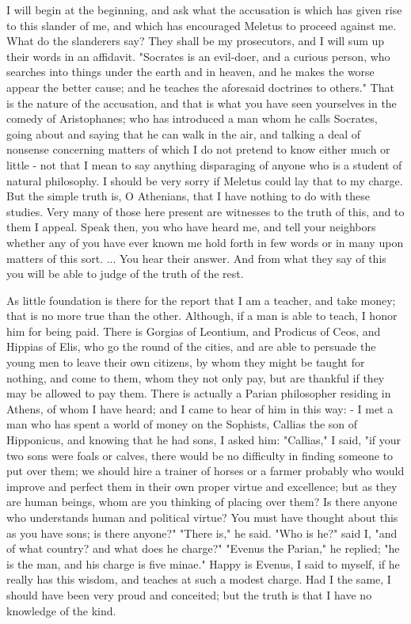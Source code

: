 I will begin at the beginning, and ask what the accusation is which
has given rise to this slander of me, and which has encouraged Meletus
to proceed against me. What do the slanderers say? They shall be my
prosecutors, and I will sum up their words in an affidavit. "Socrates
is an evil-doer, and a curious person, who searches into things under
the earth and in heaven, and he makes the worse appear the better
cause; and he teaches the aforesaid doctrines to others." That is
the nature of the accusation, and that is what you have seen yourselves
in the comedy of Aristophanes; who has introduced a man whom he calls
Socrates, going about and saying that he can walk in the air, and
talking a deal of nonsense concerning matters of which I do not pretend
to know either much or little - not that I mean to say anything disparaging
of anyone who is a student of natural philosophy. I should be very
sorry if Meletus could lay that to my charge. But the simple truth
is, O Athenians, that I have nothing to do with these studies. Very
many of those here present are witnesses to the truth of this, and
to them I appeal. Speak then, you who have heard me, and tell your
neighbors whether any of you have ever known me hold forth in few
words or in many upon matters of this sort. ... You hear their answer.
And from what they say of this you will be able to judge of the truth
of the rest. 

As little foundation is there for the report that I am a teacher,
and take money; that is no more true than the other. Although, if
a man is able to teach, I honor him for being paid. There is Gorgias
of Leontium, and Prodicus of Ceos, and Hippias of Elis, who go the
round of the cities, and are able to persuade the young men to leave
their own citizens, by whom they might be taught for nothing, and
come to them, whom they not only pay, but are thankful if they may
be allowed to pay them. There is actually a Parian philosopher residing
in Athens, of whom I have heard; and I came to hear of him in this
way: - I met a man who has spent a world of money on the Sophists,
Callias the son of Hipponicus, and knowing that he had sons, I asked
him: "Callias," I said, "if your two sons were foals or calves, there
would be no difficulty in finding someone to put over them; we should
hire a trainer of horses or a farmer probably who would improve and
perfect them in their own proper virtue and excellence; but as they
are human beings, whom are you thinking of placing over them? Is there
anyone who understands human and political virtue? You must have thought
about this as you have sons; is there anyone?" "There is," he said.
"Who is he?" said I, "and of what country? and what does he charge?"
"Evenus the Parian," he replied; "he is the man, and his charge is
five minae." Happy is Evenus, I said to myself, if he really has this
wisdom, and teaches at such a modest charge. Had I the same, I should
have been very proud and conceited; but the truth is that I have no
knowledge of the kind. 

